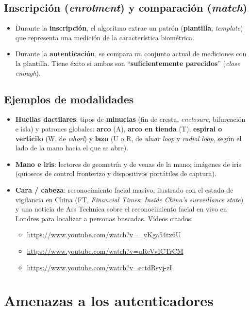 \documentclass[11pt,a4paper]{report}
\begin{document}
\subsection{Inscripción (\emph{enrolment}) y comparación (\emph{match})}
\begin{itemize}
  \item Durante la \textbf{inscripción}, el algoritmo extrae un patrón (\textbf{plantilla}, \emph{template}) que representa una medición de la característica biométrica.
  \item Durante la \textbf{autenticación}, se compara un conjunto actual de mediciones con la plantilla. Tiene éxito si ambos son ``\textbf{suficientemente parecidos}'' (\emph{close enough}).
\end{itemize}
 
\subsection{Ejemplos de modalidades}
\begin{itemize}
  \item \textbf{Huellas dactilares}: tipos de \textbf{minucias} (fin de cresta, \emph{enclosure}, bifurcación e isla) y patrones globales: \textbf{arco} (A), \textbf{arco en tienda} (T), \textbf{espiral o verticilo} (W, de \emph{whorl}) y \textbf{lazo} (U o R, de \emph{ulnar loop} y \emph{radial loop}, según el lado de la mano hacia el que se abre).
  \item \textbf{Mano e iris}: lectores de geometría y de venas de la mano; imágenes de iris (quioscos de control fronterizo y dispositivos portátiles de captura).
  \item \textbf{Cara / cabeza}: reconocimiento facial masivo, ilustrado con el estado de vigilancia en China (FT, \emph{Financial Times}: \emph{Inside China's surveillance state}) y una noticia de Ars Technica sobre el reconocimiento facial en vivo en Londres para localizar a personas buscadas. Vídeos citados:
    \begin{itemize}
      \item \url{https://www.youtube.com/watch?v=_yKga54tx6U}
      \item \url{https://www.youtube.com/watch?v=uReVvICTrCM}
      \item \url{https://www.youtube.com/watch?v=ectdRsyj-zI}
    \end{itemize}
\end{itemize}
 
\section{Amenazas a los autenticadores}
 
\end{document}
